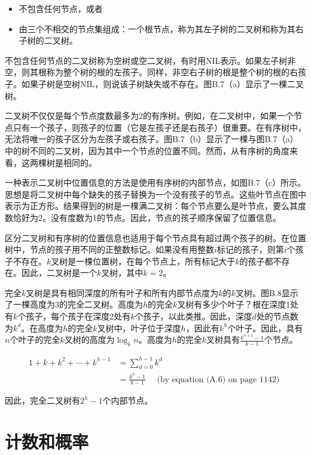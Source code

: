 \documentclass[lang=cn,newtx,10pt,scheme=chinese]{elegantbook}
\begin{document}
\begin{itemize}
\item 不包含任何节点，或者
\item 由三个不相交的节点集组成：一个根节点，称为其左子树的二叉树和称为其右子树的二叉树。
\end{itemize}

不包含任何节点的二叉树称为空树或空二叉树，有时用NIL表示。如果左子树非空，则其根称为整个树的根的左孩子。同样，非空右子树的根是整个树的根的右孩子。如果子树是空树NIL，则说该子树缺失或不存在。图B.7（a）显示了一棵二叉树。

二叉树不仅仅是每个节点度数最多为2的有序树。例如，在二叉树中，如果一个节点只有一个孩子，则孩子的位置（它是左孩子还是右孩子）很重要。在有序树中，无法将唯一的孩子区分为左孩子或右孩子。图B.7（b）显示了一棵与图B.7（a）中的树不同的二叉树，因为其中一个节点的位置不同。然而，从有序树的角度来看，这两棵树是相同的。

一种表示二叉树中位置信息的方法是使用有序树的内部节点，如图B.7（c）所示。思想是将二叉树中每个缺失的孩子替换为一个没有孩子的节点。这些叶节点在图中表示为正方形。结果得到的树是一棵满二叉树：每个节点要么是叶节点，要么其度数恰好为2。没有度数为1的节点。因此，节点的孩子顺序保留了位置信息。

区分二叉树和有序树的位置信息也适用于每个节点具有超过两个孩子的树。在位置树中，节点的孩子用不同的正整数标记。如果没有用整数$i$标记的孩子，则第$i$个孩子不存在。$k$叉树是一棵位置树，在每个节点上，所有标记大于$k$的孩子都不存在。因此，二叉树是一个$k$叉树，其中$k=2$。

完全$k$叉树是具有相同深度的所有叶子和所有内部节点度为$k$的$k$叉树。图B.8显示了一棵高度为3的完全二叉树。高度为$h$的完全$k$叉树有多少个叶子？根在深度1处有$k$个孩子，每个孩子在深度2处有$k$个孩子，以此类推。因此，深度$d$处的节点数为$k^d$。在高度为$h$的完全$k$叉树中，叶子位于深度$h$，因此有$k^h$个叶子。因此，具有$n$个叶子的完全$k$叉树的高度为$\log_k n$。高度为$h$的完全$k$叉树具有$\frac{k^{h+1}-1}{k-1}$个节点。

$$
\begin{aligned}
1+k+k^2+\cdots+k^{h-1} & =\sum_{d=0}^{h-1} k^d \\
& =\frac{k^h-1}{k-1} \quad \text { (by equation (A.6) on page 1142) }
\end{aligned}
$$

因此，完全二叉树有$2^h-1$个内部节点。

\chapter{计数和概率}
\end{document}

